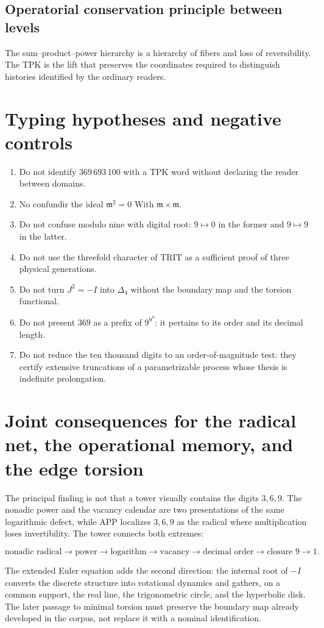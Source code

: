 \subsection{Operatorial conservation principle between levels}

The sum--product--power hierarchy is a hierarchy of fibers and loss of
reversibility. The TPK is the lift that preserves the coordinates required
to distinguish histories identified by the ordinary readers.


\section{Typing hypotheses and negative controls}

\begin{enumerate}
\item Do not identify \(369\,693\,100\) with a TPK word without declaring the reader between domains.
\item No confundir the ideal \(\mathfrak m^2=0\) With \(\mathfrak m\times\mathfrak m\).
\item Do not confuse modulo nine with digital root: \(9\mapsto0\) in the former and \(9\mapsto9\) in the latter.
\item Do not use the threefold character of TRIT as a sufficient proof of three physical generations.
\item Do not turn \(J^2=-I\) into \(\Delta_4\) without the boundary map and the torsion functional.
\item Do not present \(369\) as a prefix of \(9^{9^9}\): it pertains to its order and its decimal length.
\item Do not reduce the ten thousand digits to an order-of-magnitude test: they certify extensive truncations of a parametrizable process whose thesis is indefinite prolongation.
\end{enumerate}

\section{Joint consequences for the radical net, the operational memory, and the edge torsion}

The principal finding is not that a tower visually contains the digits \(3,6,9\). The nonadic power and the vacancy calendar are two presentations of the same logarithmic defect, while APP localizes \(3,6,9\) as the radical where multiplication loses invertibility. The tower connects both extremes:

\[
\text{nonadic radical}
\longrightarrow
\text{power}
\longrightarrow
\text{logarithm}
\longrightarrow
\text{vacancy}
\longrightarrow
\text{decimal order}
\longrightarrow
\text{closure }9\to1.
\]

The extended Euler equation adds the second direction: the internal root of \(-I\) converts the discrete structure into rotational dynamics and gathers, on a common support, the real line, the trigonometric circle, and the hyperbolic disk. The later passage to minimal torsion must preserve the boundary map already developed in the corpus, not replace it with a nominal identification.
